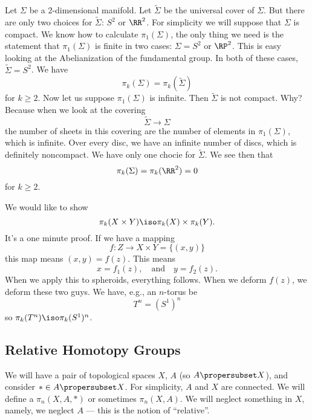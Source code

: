
Let $\Sigma$ be a 2-dimensional manifold. Let
$\widetilde{\Sigma}$ be the universal cover of $\Sigma$. But
there are only two choices for $\widetilde{\Sigma}$: $S^2$ or
$\RR^2$. For simplicity we will suppose that $\Sigma$ is
compact. We know how to calculate $\pi_{1}(\Sigma)$, the only
thing we need is the statement that $\pi_{1}(\Sigma)$ is finite
in two cases: $\Sigma=S^2$ or $\RP^2$. This is easy looking at
the Abelianization of the fundamental group. In both of these
cases, $\widetilde{\Sigma}=S^2$. We have
\begin{equation}
\pi_{k}(\Sigma)=\pi_{k}(\widetilde{\Sigma})
\end{equation}
for $k\geq2$. Now let us suppose $\pi_{1}(\Sigma)$ is
infinite. Then $\widetilde{\Sigma}$ is not compact. Why? Because
when we look at the covering
\begin{equation*}
\widetilde{\Sigma}\to\Sigma
\end{equation*}
the number of sheets in this covering are the number of elements
in $\pi_{1}(\Sigma)$, which is infinite. Over every disc, we have
an infinite number of discs, which is definitely noncompact. We
have only one chocie for $\widetilde{\Sigma}$. We see then that
\begin{equation}
\pi_{k}(\Sigma)=\pi_{k}(\RR^2)=0
\end{equation}
for $k\geq2$.

We would like to show 
\begin{equation}
\pi_{k}(X\times Y)\iso\pi_{k}(X)\times\pi_{k}(Y).
\end{equation}
It's a one minute proof. If we have a mapping
\begin{equation}
f\colon Z\to X\times Y=\{(x,y)\}
\end{equation}
this map means $(x,y)=f(z)$. This means
\begin{equation}
x=f_{1}(z),\quad\mbox{and}\quad y=f_{2}(z).
\end{equation}
When we apply this to spheroids, everything follows. When we
deform $f(z)$, we deform these two guys. We have, e.g., an
$n$-torus be
\begin{equation}
T^n=(S^1)^n
\end{equation}
so $\pi_{k}(T^n)\iso\pi_{k}(S^1)^n$.
 
\subsection{Relative Homotopy Groups}
%
We will have a pair of topological spaces $X$, $A$ (so
$A\propersubset X$), and consider $*\in A\propersubset X$. For
simplicity, $A$ and $X$ are connected. We will define a
 $\pi_{n}(X,A,*)$ or sometimes
$\pi_{n}(X,A)$. We will neglect something in $X$, namely, we
neglect $A$ --- this is the notion of ``relative''.

